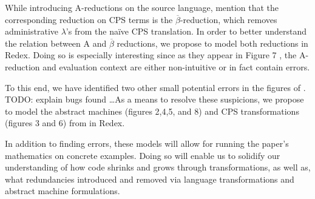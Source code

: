 \documentclass[11pt]{article}
\begin{document}
While introducing A-reductions on the source language, \citet{Flanagan:1993fk}
mention that the corresponding reduction on CPS terms is the
$\overline{\beta}$-reduction, which removes administrative $\lambda$'s from the
na\"{i}ve CPS translation.  In order to better understand the relation between
A and $\overline{\beta}$ reductions, we propose to model both reductions in
Redex.  Doing so is especially interesting since as they appear in Figure 7
\cite{Flanagan:1993fk}, the A-reduction and evaluation context are either
non-intuitive or in fact contain errors.

To this end, we have identified two other small potential errors in the figures
of \cite{Flanagan:1993fk}. TODO: explain bugs found \ldots As a means to
resolve these suspicions, we propose to model the abstract machines (figures
2,4,5, and 8) and CPS transformations (figures 3 and 6) from
\cite{Flanagan:1993fk} in Redex.

In addition to finding errors, these models will allow for running the paper's
mathematics on concrete examples.
Doing so will enable us to solidify our understanding of how code shrinks and
grows through transformations, as well as, what redundancies introduced and
removed via language transformations and abstract machine formulations.




\end{document}
